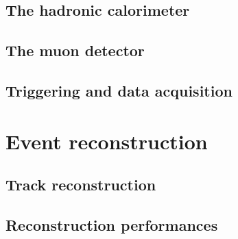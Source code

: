 \subsection{The hadronic calorimeter} 
\subsection{The muon detector} 
\subsection{Triggering and data acquisition} 
\section{Event reconstruction} 
\subsection{Track reconstruction} 
\subsection{Reconstruction performances}
\clearpage
